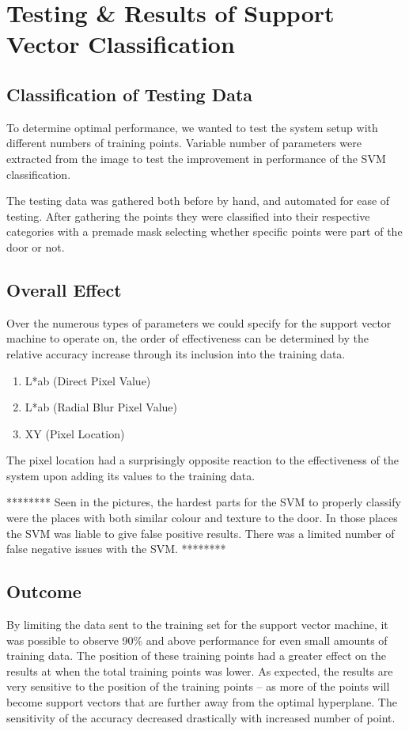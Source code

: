 \chapter {Testing \& Results of Support Vector Classification}

\section{Classification of Testing Data}
To determine optimal performance, we wanted to test the system setup with different numbers of training points. Variable number of parameters were extracted from the image to test the improvement in performance of the SVM classification.

The testing data was gathered both before by hand, and automated for ease of testing. After gathering the points they were classified into their respective categories with a premade mask selecting whether specific points were part of the door or not.

\section{Overall Effect}

Over the numerous types of parameters we could specify for the support vector machine to operate on, the order of effectiveness can be determined by the relative accuracy increase through its inclusion into the training data.

\begin{enumerate}
  \item L*ab (Direct Pixel Value)
  \item L*ab (Radial Blur Pixel Value)
  \item XY (Pixel Location)
\end{enumerate}

The pixel location had a surprisingly opposite reaction to the effectiveness of the system upon adding its values to the training data.

********
Seen in the pictures, the hardest parts for the SVM to properly classify were the places with both similar colour and texture to the door. In those places the SVM was liable to give false positive results. There was a limited number of false negative issues with the SVM.
********

\section{Outcome}

By limiting the data sent to the training set for the support vector machine, it was possible to observe 90\% and above performance for even small amounts of training data. The position of these training points had a greater effect on the results at when the total training points was lower. As expected, the results are very sensitive to the position of the training points -- as more of the points will become support vectors that are further away from the optimal hyperplane. The sensitivity of the accuracy decreased drastically with increased number of point.




